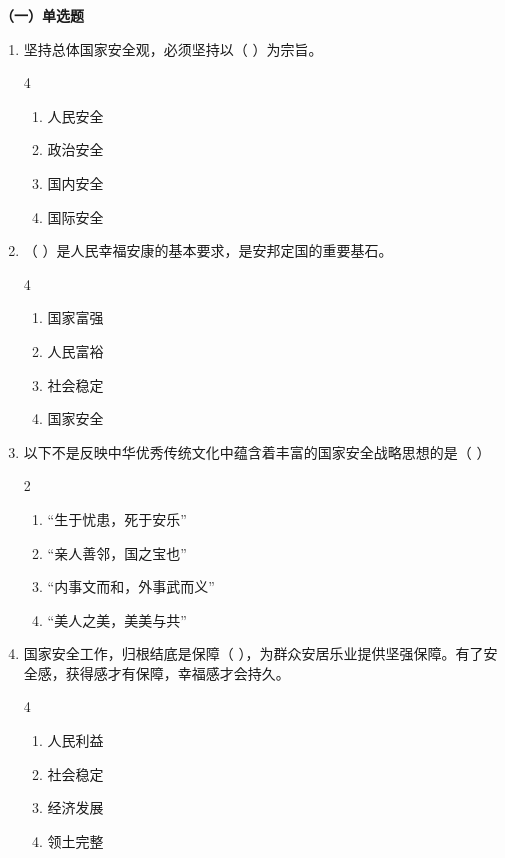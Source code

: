 \documentclass[a4paper,11pt]{ctexart}
\begin{document}
\textbf{（一）单选题}
\begin{enumerate}
    \item 坚持总体国家安全观，必须坚持以（ ）为宗旨。
    \begin{multicols}{4}
    \begin{enumerate}
        \item 人民安全
        \item 政治安全
        \item 国内安全
        \item 国际安全
    \end{enumerate}
    \end{multicols}

    \item （ ）是人民幸福安康的基本要求，是安邦定国的重要基石。
    \begin{multicols}{4}
    \begin{enumerate}
        \item 国家富强
        \item 人民富裕
        \item 社会稳定
        \item 国家安全
    \end{enumerate}
    \end{multicols}

    \item 以下不是反映中华优秀传统文化中蕴含着丰富的国家安全战略思想的是（ ）
    \begin{multicols}{2}
    \begin{enumerate}
        \item “生于忧患，死于安乐”
        \item “亲人善邻，国之宝也”
        \item “内事文而和，外事武而义”
        \item “美人之美，美美与共”
    \end{enumerate}
    \end{multicols}

    \item 国家安全工作，归根结底是保障（ ），为群众安居乐业提供坚强保障。有了安全感，获得感才有保障，幸福感才会持久。
    \begin{multicols}{4}
    \begin{enumerate}
        \item 人民利益
        \item 社会稳定
        \item 经济发展
        \item 领土完整
    \end{enumerate}
    \end{multicols}


\end{enumerate}
\end{document}
